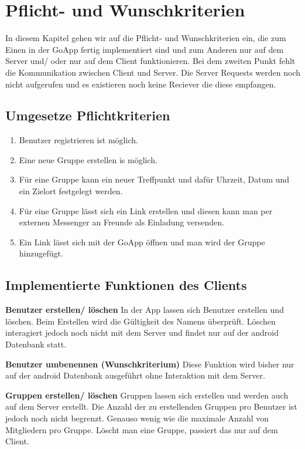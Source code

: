 \section{Pflicht- und Wunschkriterien}

In diesem Kapitel gehen wir auf die Pflicht- und Wunschkriterien ein, die zum Einen in der GoApp fertig implementiert sind und zum Anderen nur auf dem Server und/ oder nur auf dem Client funktionieren. Bei dem zweiten Punkt fehlt die Kommunikation zwischen Client und Server. Die Server Requests werden noch nicht aufgerufen und es existieren noch keine Reciever die diese empfangen.

\subsection{Umgesetze Pflichtkriterien}

\begin{enumerate}
	\item Benutzer registrieren ist möglich.
	\item Eine neue Gruppe erstellen is möglich.
	\item Für eine Gruppe kann ein neuer Treffpunkt und dafür Uhrzeit, Datum und ein Zielort festgelegt werden.
	\item Für eine Gruppe lässt sich ein Link erstellen und diesen kann man per externen Messenger an Freunde als Einladung versenden.
	\item Ein Link lässt sich mit der GoApp öffnen und man wird der Gruppe hinzugefügt.
\end{enumerate}

\subsection{Implementierte Funktionen des Clients}

\textbf{Benutzer erstellen/ löschen}
In der App lassen sich Benutzer erstellen und löschen. Beim Erstellen wird die Gültigkeit des Namens überprüft. Löschen interagiert jedoch noch nicht mit dem Server und findet nur auf der android Datenbank statt.

\textbf{Benutzer umbenennen (Wunschkriterium)}
Diese Funktion wird bisher nur auf der android Datenbank ausgeführt ohne Interaktion mit dem Server.

\textbf{Gruppen erstellen/ löschen}
Gruppen lassen sich erstellen und werden auch auf dem Server erstellt. Die Anzahl der zu erstellenden Gruppen pro Benutzer ist jedoch noch nicht begrenzt. Genauso wenig wie die maximale Anzahl von Mitgliedern pro Gruppe. Löscht man eine Gruppe, passiert das nur auf dem Client.

